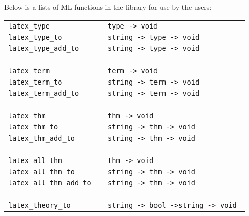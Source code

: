 Below is a lists of ML functions in the library for use by the users:
\begin{center}
  \begin{tabular}{>{\tt}l>{\tt}l}
latex\_type	& type -> void	\\
latex\_type\_to	& string -> type -> void \\
latex\_type\_add\_to	& string -> type -> void \\
 & \\
latex\_term	& term -> void	\\
latex\_term\_to	& string -> term -> void \\
latex\_term\_add\_to	& string -> term -> void \\
 & \\
latex\_thm 	& thm  -> void	\\
latex\_thm\_to	& string -> thm -> void \\
latex\_thm\_add\_to	& string -> thm -> void \\
 & \\
latex\_all\_thm	& thm -> void	\\
latex\_all\_thm\_to	& string -> thm -> void \\
latex\_all\_thm\_add\_to	& string -> thm -> void \\
 & \\
latex\_theory\_to	& string -> bool ->string -> void \\
  \end{tabular}
\end{center}

